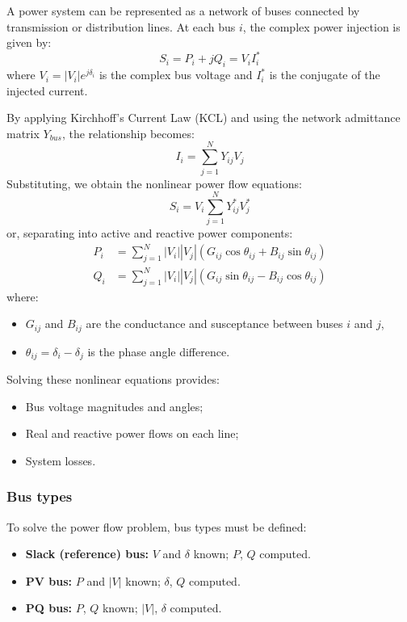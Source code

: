 \documentclass[11pt]{article}
\begin{document}
	A power system can be represented as a network of buses connected by transmission or distribution lines.  
	At each bus $i$, the complex power injection is given by:
	\[
	S_i = P_i + jQ_i = V_i I_i^*
	\]
	where $V_i=|V_i|e^{j\delta_i}$ is the complex bus voltage and $I_i^*$ is the conjugate of the injected current.
	
	By applying Kirchhoff’s Current Law (KCL) and using the network admittance matrix $Y_{bus}$, the relationship becomes:
	\[
	I_i = \sum_{j=1}^N Y_{ij} V_j
	\]
	Substituting, we obtain the nonlinear power flow equations:
	\[
	S_i = V_i \sum_{j=1}^N Y_{ij}^* V_j^*
	\]
	or, separating into active and reactive power components:
	\[
	\begin{aligned}
		P_i &= \sum_{j=1}^N |V_i||V_j| \left( G_{ij} \cos\theta_{ij} + B_{ij} \sin\theta_{ij} \right) \\
		Q_i &= \sum_{j=1}^N |V_i||V_j| \left( G_{ij} \sin\theta_{ij} - B_{ij} \cos\theta_{ij} \right)
	\end{aligned}
	\]
	where:
	\begin{itemize}
		\item $G_{ij}$ and $B_{ij}$ are the conductance and susceptance between buses $i$ and $j$,
		\item $\theta_{ij} = \delta_i - \delta_j$ is the phase angle difference.
	\end{itemize}
	
	Solving these nonlinear equations provides:
	\begin{itemize}
		\item Bus voltage magnitudes and angles;
		\item Real and reactive power flows on each line;
		\item System losses.
	\end{itemize}
	
	\subsubsection*{Bus types}
	
	To solve the power flow problem, bus types must be defined:
	\begin{itemize}
		\item \textbf{Slack (reference) bus:} $V$ and $\delta$ known; $P$, $Q$ computed.
		\item \textbf{PV bus:} $P$ and $|V|$ known; $\delta$, $Q$ computed.
		\item \textbf{PQ bus:} $P$, $Q$ known; $|V|$, $\delta$ computed.
	\end{itemize}
	
\end{document}
